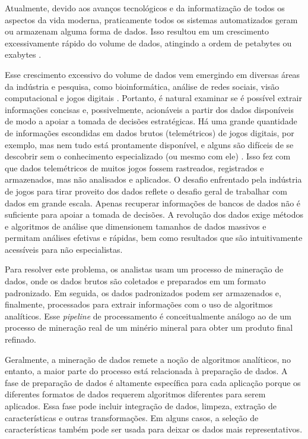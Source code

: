 Atualmente, devido aos avanços tecnológicos e da informatização de todos os aspectos da vida moderna, praticamente todos os sistemas automatizados geram ou armazenam alguma forma de dados. Isso resultou em um crescimento excessivamente rápido do volume de dados, atingindo a ordem de petabytes ou exabytes \cite{aggarwal2015data}.

Esse crescimento excessivo do volume de dados vem emergindo em diversas áreas da indústria e pesquisa, como bioinformática, análise de redes sociais, visão computacional e jogos digitais \cite{el2016game}. Portanto, é natural examinar se é possível extrair informações concisas e, possivelmente, acionáveis a partir dos dados disponíveis de modo a apoiar a tomada de decisões estratégicas. Há uma grande quantidade de informações escondidas em dados brutos (telemétricos) de jogos digitais, por exemplo, mas nem tudo está prontamente disponível, e alguns são difíceis de se descobrir sem o conhecimento especializado (ou mesmo com ele) \cite{el2016game}. Isso fez com que dados telemétricos de muitos jogos fossem rastreados, registrados e armazenados, mas não analisados e aplicados. O desafio enfrentado pela indústria de jogos para tirar proveito dos dados reflete o desafio geral de trabalhar com dados em grande escala. Apenas recuperar informações de bancos de dados não é suficiente para apoiar a tomada de decisões. A revolução dos dados exige métodos e algoritmos de análise que dimensionem tamanhos de dados massivos e permitam análises efetivas e rápidas, bem como resultados que são intuitivamente acessíveis para não especialistas.

Para resolver este problema, os analistas usam um processo de mineração de dados, onde os dados brutos são coletados e preparados em um formato padronizado. Em seguida, os dados padronizados podem ser armazenados e, finalmente, processados para extrair informações com o uso de algoritmos analíticos. Esse \textit{pipeline} de processamento é conceitualmente análogo ao de um processo de mineração real de um minério mineral para obter um produto final refinado.

Geralmente, a mineração de dados remete a noção de algoritmos analíticos, no entanto, a maior parte do processo está relacionada à preparação de dados. A fase de preparação de dados é altamente específica para cada aplicação porque os diferentes formatos de dados requerem algoritmos diferentes para serem aplicados. Essa fase pode incluir integração de dados, limpeza, extração de características e outras transformações. Em alguns casos, a seleção de características também pode ser usada para deixar os dados mais representativos.


